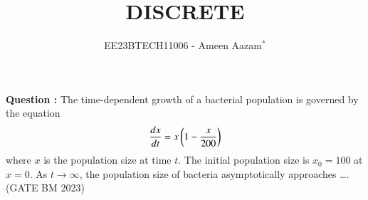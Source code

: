 \documentclass[journal,12pt,twocolumn]{IEEEtran}
\theoremstyle{remark}
\begin{document}

\vspace{3cm}

\title{DISCRETE}
\author{EE23BTECH11006 - Ameen Aazam$^{*}$%
}
\maketitle
\newpage
\bigskip

\renewcommand{\thefigure}{\theenumi}
\renewcommand{\thetable}{\theenumi}

\vspace{3cm}
\textbf{Question :}
The time-dependent growth of a bacterial population is governed by the equation
\begin{align}
    \frac{dx}{dt}=x\left(1-\frac{x}{200}\right)
\end{align}
where $x$ is the population size at time $t$. The initial population size is $x_0=100$
at $x=0$. As $t \rightarrow \infty$, the population size of bacteria asymptotically approaches \ldots.
\hfill{(GATE BM 2023)}
\end{document}
